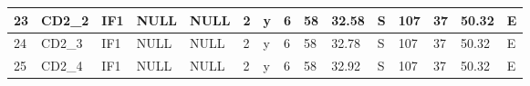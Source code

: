 {\begin{table}[]
\begin{tabular}{|l|l|l|l|l|l|l|l|l|l|l|l|l|l|l|}
		23                                & CD2\_2                                    & IF1                                       & NULL                            & NULL                            & 2                               & y                                    & 6                                                                                    & 58                                                                                   & 32.58                                                                                & S                                                                                 & 107                                                                                   & 37                                                                                    & 50.32                                                                                 & E                                                                                  \\ \hline
		24                                & CD2\_3                                    & IF1                                       & NULL                            & NULL                            & 2                               & y                                    & 6                                                                                    & 58                                                                                   & 32.78                                                                                & S                                                                                 & 107                                                                                   & 37                                                                                    & 50.32                                                                                 & E                                                                                  \\ \hline
		25                                & CD2\_4                                    & IF1                                       & NULL                            & NULL                            & 2                               & y                                    & 6                                                                                    & 58                                                                                   & 32.92                                                                                & S                                                                                 & 107                                                                                   & 37                                                                                    & 50.32                                                                                 & E                                                                                  \\ \hline

\end{tabular}
\end{table}}

